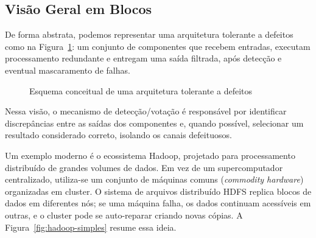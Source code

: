 \documentclass[12pt,a4paper]{report}
\begin{document}
\subsection{Visão Geral em Blocos}

De forma abstrata, podemos representar uma arquitetura tolerante a defeitos
como na Figura~\ref{fig:arquitetura-tolerante-defeitos}: um conjunto de
componentes que recebem entradas, executam processamento redundante e
entregam uma saída filtrada, após detecção e eventual mascaramento de
falhas.

\begin{figure}[h]
    \centering
    \caption{Esquema conceitual de uma arquitetura tolerante a defeitos}
    \label{fig:arquitetura-tolerante-defeitos}
\end{figure}

Nessa visão, o mecanismo de detecção/votação é responsável por identificar
discrepâncias entre as saídas dos componentes e, quando possível, selecionar
um resultado considerado correto, isolando os canais defeituosos.

Um exemplo moderno é o ecossistema Hadoop, projetado para processamento
distribuído de grandes volumes de dados. Em vez de um supercomputador
centralizado, utiliza-se um conjunto de máquinas comuns (\emph{commodity
hardware}) organizadas em cluster. O sistema de arquivos distribuído HDFS
replica blocos de dados em diferentes nós; se uma máquina falha, os dados
continuam acessíveis em outras, e o cluster pode se auto-reparar criando
novas cópias. A Figura~\ref{fig:hadoop-simples} resume essa ideia.
\end{document}
